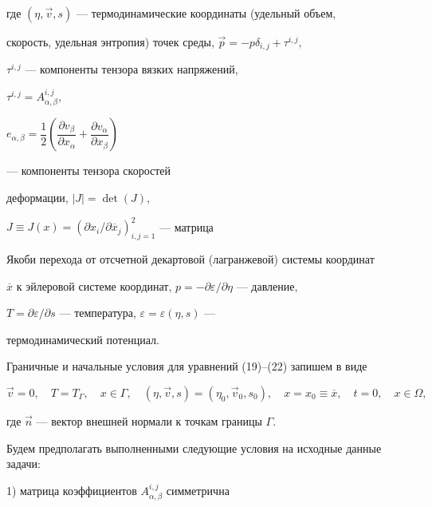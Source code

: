 где $(\eta,\Vec v, s)$ --- термодинамические координаты (удельный объем, 


скорость, удельная энтропия) точек среды, $\Vec p=-p\delta_{i,j}+\tau^{i,j},$ 


$\tau^{i,j}$ --- компоненты тензора вязких напряжений, 


$\tau^{i,j}=A^{i,j}_{\alpha,\beta},$ 


$e_{\alpha,\beta}=\dfrac12\left(\dfrac{\partial v_\beta}{\partial x_\alpha} 


+\dfrac{\partial v_\alpha}{\partial x_\beta}\right)$


--- компоненты тензора скоростей 


деформации, $|J|=\det(J),$ 


$J\equiv J(x)=(\partial x_i/\partial \overline x_j)^2_{i,j=1}$ --- матрица 


Якоби перехода от отсчетной декартовой (лагранжевой) системы координат 


$\overline x$ к эйлеровой системе координат, $p=-\partial\varepsilon / 


\partial\eta$ --- давление, 


$T=\partial\varepsilon /\partial s$ --- температура, $\varepsilon= 


\varepsilon(\eta,s)$ --- 


термодинамический потенциал. 


 


Граничные и начальные условия для уравнений (19)--(22) запишем в виде 


\begin{equation} 


\Vec v=0,\quad T=T_\Gamma,\quad x\in \Gamma,\quad 


(\eta,\Vec v,s)=(\eta_0, \Vec v_0,s_0),\quad 


x=x_0\equiv \overline x,\quad t=0,\quad x\in \Omega, 


\end{equation} 


где $\Vec n$ --- вектор внешней нормали к точкам границы $\Gamma.$ 


 


Будем предполагать выполненными следующие условия на исходные данные задачи: 


 


1) матрица коэффициентов $A^{i,j}_{\alpha,\beta}$ симметрична 


